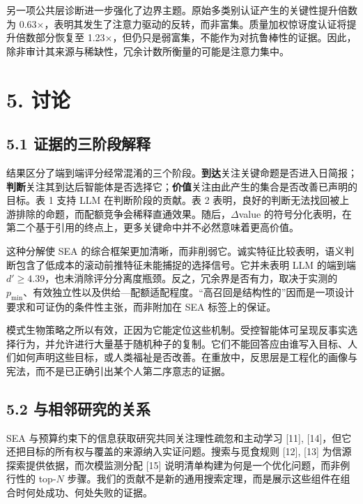 \documentclass[
  chinese,
  conference,10pt]{IEEEtran}
\begin{document}
另一项公共层诊断进一步强化了边界主题。原始多类别认证产生的关键性提升倍数为 0.63×，表明其发生了注意力驱动的反转，而非富集。质量加权惊讶度认证将提升倍数部分恢复至 1.23×，但仍只是弱富集，不能作为对抗鲁棒性的证据。因此，除非审计其来源与稀缺性，冗余计数所衡量的可能是注意力集中。

\section{5. 讨论}\label{ux8ba8ux8bba}

\subsection{5.1 证据的三阶段解释}\label{ux8bc1ux636eux7684ux4e09ux9636ux6bb5ux89e3ux91ca}

结果区分了端到端评分经常混淆的三个阶段。\textbf{到达}关注关键命题是否进入日简报；\textbf{判断}关注其到达后智能体是否选择它；\textbf{价值}关注由此产生的集合是否改善已声明的目标。表 1 支持 LLM 在判断阶段的贡献。表 2 表明，良好的判断无法找回被上游排除的命题，而配额竞争会稀释直通效果。随后，\(\Delta\)value 的符号分化表明，在第二个基于引用的终点上，更多关键命中并不必然意味着更高价值。

这种分解使 SEA 的综合框架更加清晰，而非削弱它。诚实特征比较表明，语义判断包含了低成本的滚动前推特征未能捕捉的选择信号。它并未表明 LLM 的端到端 \(d'\ge4.39\)，也未消除评分分离度瓶颈。反之，冗余界是否有力，取决于实测的 \(p_{\min}\)、有效独立性以及供给---配额适配程度。``高召回是结构性的''因而是一项设计要求和可证伪的条件性主张，而非附加在 SEA 标签上的保证。

模式生物策略之所以有效，正因为它能定位这些机制。受控智能体可呈现反事实选择行为，并允许进行大量基于随机种子的复制。它们不能回答应由谁写入目标、人们如何声明这些目标，或人类福祉是否改善。在重放中，反思层是工程化的画像与宪法，而不是已正确引出某个人第二序意志的证据。

\subsection{5.2 与相邻研究的关系}\label{ux4e0eux76f8ux90bbux7814ux7a76ux7684ux5173ux7cfb}

SEA 与预算约束下的信息获取研究共同关注理性疏忽和主动学习 {[}11{]}, {[}14{]}，但它还把目标的所有权与覆盖的来源纳入实证问题。搜索与觅食规则 {[}12{]}, {[}13{]} 为信源探索提供依据，而次模监测分配 {[}15{]} 说明清单构建为何是一个优化问题，而非例行性的 top-\(N\) 步骤。我们的贡献不是新的通用搜索定理，而是展示这些组件在组合时何处成功、何处失败的证据。
\end{document}
